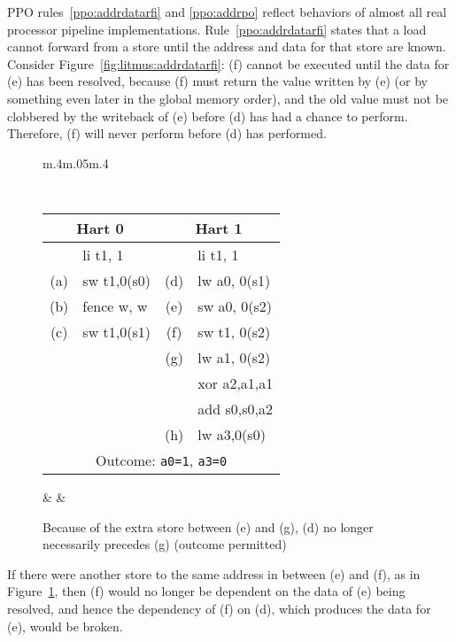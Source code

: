 PPO rules~\ref{ppo:addrdatarfi} and \ref{ppo:addrpo} reflect behaviors of almost all real processor pipeline implementations.
Rule~\ref{ppo:addrdatarfi} states that a load cannot forward from a store until the address and data for that store are known.
Consider Figure~\ref{fig:litmus:addrdatarfi}:
(f) cannot be executed until the data for (e) has been resolved, because (f) must return the value written by (e) (or by something even later in the global memory order), and the old value must not be clobbered by the writeback of (e) before (d) has had a chance to perform.
Therefore, (f) will never perform before (d) has performed.

\begin{figure}[h!]
  \centering
  \begin{tabular}{m{.4\linewidth}m{.05\linewidth}m{.4\linewidth}}
  {
    \tt\small
    \begin{tabular}{cl||cl}
    \multicolumn{2}{c}{Hart 0} & \multicolumn{2}{c}{Hart 1} \\
    \hline
          & li t1, 1    &     & li t1, 1       \\
      (a) & sw t1,0(s0) & (d) & lw a0, 0(s1)   \\
      (b) & fence w, w  & (e) & sw a0, 0(s2)   \\
      (c) & sw t1,0(s1) & (f) & sw t1, 0(s2)   \\
          &             & (g) & lw a1, 0(s2)   \\
          &             &     & xor a2,a1,a1   \\
          &             &     & add s0,s0,a2   \\
          &             & (h) & lw a3,0(s0)    \\   

      \hline
      \multicolumn{4}{c}{Outcome: {\tt a0=1}, {\tt a3=0}}
    \end{tabular}
  } & &
  
  \end{tabular}

  \caption{Because of the extra store between (e) and (g), (d) no longer necessarily precedes (g) (outcome permitted)}
  \label{fig:litmus:addrdatarfi_no}
\end{figure}

If there were another store to the same address in between (e) and (f), as in Figure~\ref{fig:litmus:addrdatarfi_no}, then (f) would no longer be dependent on the data of (e) being resolved, and hence the dependency of (f) on (d), which produces the data for (e), would be broken.

